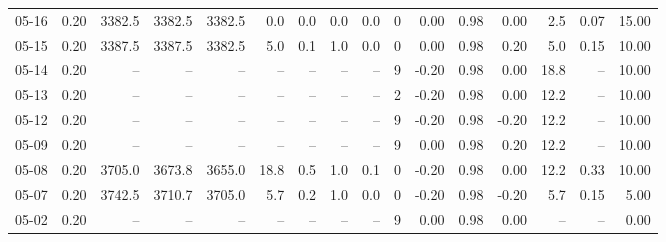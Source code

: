 \begin{threeparttable}
{\begin{tabular}{lrrrrrrrrrrrrrrr}
  05-16 &     0.20 & 3382.5 & 3382.5 & 3382.5 &        0.0 &            0.0 &                      0.0 &                 0.0 &              0 &       0.00 &      0.98 &           0.00 &              2.5 &            0.07 &                  15.00 \\
  05-15 &     0.20 & 3387.5 & 3387.5 & 3382.5 &        5.0 &            0.1 &                      1.0 &                 0.0 &              0 &       0.00 &      0.98 &           0.20 &              5.0 &            0.15 &                  10.00 \\
  05-14 &     0.20 &     -- &     -- &     -- &         -- &             -- &                       -- &                  -- &              9 &      -0.20 &      0.98 &           0.00 &             18.8 &              -- &                  10.00 \\
  05-13 &     0.20 &     -- &     -- &     -- &         -- &             -- &                       -- &                  -- &              2 &      -0.20 &      0.98 &           0.00 &             12.2 &              -- &                  10.00 \\
  05-12 &     0.20 &     -- &     -- &     -- &         -- &             -- &                       -- &                  -- &              9 &      -0.20 &      0.98 &          -0.20 &             12.2 &              -- &                  10.00 \\
  05-09 &     0.20 &     -- &     -- &     -- &         -- &             -- &                       -- &                  -- &              9 &       0.00 &      0.98 &           0.20 &             12.2 &              -- &                  10.00 \\
  05-08 &     0.20 & 3705.0 & 3673.8 & 3655.0 &       18.8 &            0.5 &                      1.0 &                 0.1 &              0 &      -0.20 &      0.98 &           0.00 &             12.2 &            0.33 &                  10.00 \\
  05-07 &     0.20 & 3742.5 & 3710.7 & 3705.0 &        5.7 &            0.2 &                      1.0 &                 0.0 &              0 &      -0.20 &      0.98 &          -0.20 &              5.7 &            0.15 &                   5.00 \\
  05-02 &     0.20 &     -- &     -- &     -- &         -- &             -- &                       -- &                  -- &              9 &       0.00 &      0.98 &           0.00 &               -- &              -- &                   0.00 \\

\end{tabular}}
\end{threeparttable}
